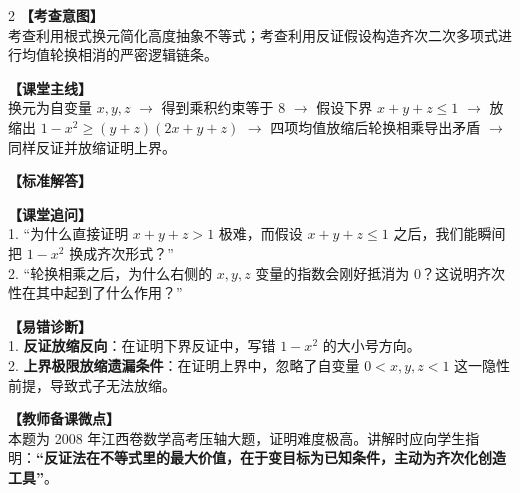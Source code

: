 \documentclass[11pt,a4paper]{ctexart}
\begin{document}
\begin{paracol}{2}
  \textbf{【考查意图】}\\
  考查利用根式换元简化高度抽象不等式；考查利用反证假设构造齐次二次多项式进行均值轮换相消的严密逻辑链条。
  
  \textbf{【课堂主线】}\\
  换元为自变量 \(x,y,z\) \(\to\) 得到乘积约束等于 8 \(\to\) 假设下界 \(x+y+z \leqslant 1\) \(\to\) 放缩出 \(1-x^2 \geqslant (y+z)(2x+y+z)\) \(\to\) 四项均值放缩后轮换相乘导出矛盾 \(\to\) 同样反证并放缩证明上界。
  
  \textbf{【标准解答】}\\
  \qFiveSolution
  
  \textbf{【课堂追问】}\\
  1. “为什么直接证明 \(x+y+z>1\) 极难，而假设 \(x+y+z \leqslant 1\) 之后，我们能瞬间把 \(1-x^2\) 换成齐次形式？”\\
  2. “轮换相乘之后，为什么右侧的 \(x, y, z\) 变量的指数会刚好抵消为 0？这说明齐次性在其中起到了什么作用？”
  
  \switchcolumn
  \textbf{【易错诊断】}\\
  1. \textbf{反证放缩反向}：在证明下界反证中，写错 \(1-x^2\) 的大小号方向。\\
  2. \textbf{上界极限放缩遗漏条件}：在证明上界中，忽略了自变量 \(0 < x, y, z < 1\) 这一隐性前提，导致式子无法放缩。
  
  \textbf{【教师备课微点】}\\
  本题为 2008 年江西卷数学高考压轴大题，证明难度极高。讲解时应向学生指明：\textbf{“反证法在不等式里的最大价值，在于变目标为已知条件，主动为齐次化创造工具”}。
\end{paracol}

\vspace{0.8em}
\par{}
\vspace{0.8em}

{\small
\qSixStem
}
\end{document}
